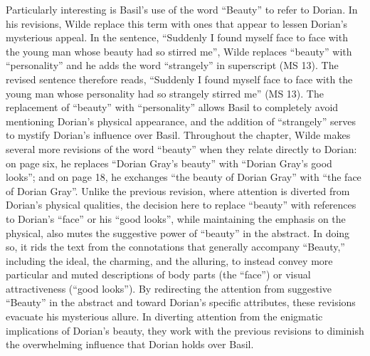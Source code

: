 \documentclass[11pt]{article}
\begin{document}
Particularly interesting is Basil’s use of the word “Beauty” to refer
to Dorian. In his revisions, Wilde replace this term with ones that
appear to lessen Dorian’s mysterious appeal. In the sentence,
“Suddenly I found myself face to face with the young man whose beauty
had so stirred me”, Wilde replaces “beauty” with “personality” and he
adds the word “strangely” in superscript (MS 13). The revised sentence
therefore reads, “Suddenly I found myself face to face with the young
man whose personality had so strangely stirred me” (MS 13). The
replacement of “beauty” with “personality” allows Basil to completely
avoid mentioning Dorian’s physical appearance, and the addition of
“strangely” serves to mystify Dorian’s influence over
Basil. Throughout the chapter, Wilde makes several more revisions of
the word “beauty” when they relate directly to Dorian: on page six, he
replaces “Dorian Gray’s beauty” with “Dorian Gray’s good looks”; and
on page 18, he exchanges “the beauty of Dorian Gray” with “the face of
Dorian Gray”. Unlike the previous revision, where attention is
diverted from Dorian’s physical qualities, the decision here to
replace “beauty” with references to Dorian’s “face” or his “good
looks”, while maintaining the emphasis on the physical, also mutes the
suggestive power of “beauty” in the abstract. In doing so, it rids the
text from the connotations that generally accompany “Beauty,”
including the ideal, the charming, and the alluring, to instead convey
more particular and muted descriptions of body parts (the “face”) or
visual attractiveness (“good looks”). By redirecting the attention
from suggestive “Beauty” in the abstract and toward Dorian’s specific
attributes, these revisions evacuate his mysterious allure. In
diverting attention from the enigmatic implications of Dorian’s
beauty, they work with the previous revisions to diminish the
overwhelming influence that Dorian holds over Basil.
\end{document}

